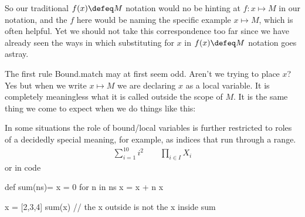 So our traditional $f(x)\defeq M$ notation would no be hinting at 
$f:x\mapsto M$ in our notation, and the $f$ here would be naming 
the specific example $x\mapsto M$, which is often helpful.  Yet 
we should not take this correspondence too far since we have already 
seen the ways in which substituting for $x$ in $f(x)\defeq M$ notation 
goes astray.

The first rule Bound.match may at first seem odd.  Aren't we trying to place $x$?
Yes but when we write $x\mapsto M$ we are declaring $x$ as a local variable.  
It is completely meaningless what it is called outside the scope of $M$.
It is the same thing we come to expect when we do things like this:


In some situations the role of bound/local variables is further 
restricted to roles of a decidedly special meaning, for example, as indices that 
run through a range.
\begin{align*}
    \sum_{i=1}^{10} i^2 \qquad \prod_{i\in I}X_i 
\end{align*}
or in code 
\begin{center}
\begin{Pcode}[]
def sum(ns)= {
  x = 0
  for n in ns 
    x = x + n
  x  
}

x = [2,3,4]
sum(x)  // the x outside is not the x inside sum
\end{Pcode}
\end{center}